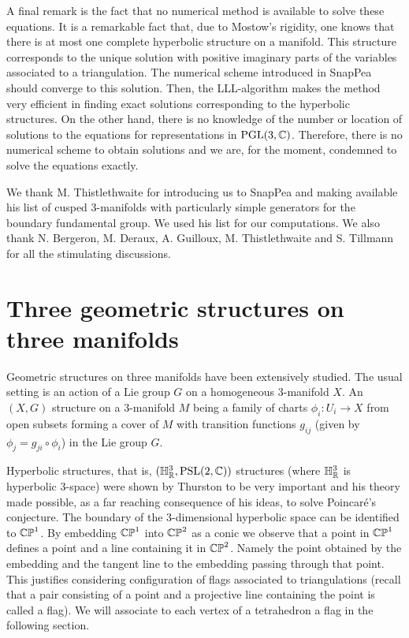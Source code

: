 A final remark is the fact that no numerical method is available to solve these equations. It is a remarkable fact that, due to Mostow's rigidity, one knows that  there is  at most
one complete hyperbolic structure on a manifold.
This structure corresponds to the unique solution with positive imaginary parts of the variables associated to a triangulation.
The numerical scheme introduced in SnapPea should converge to this solution.
Then, the LLL-algorithm makes the method very efficient in finding exact solutions corresponding to the hyperbolic structures.
On the other hand, there is no knowledge of the number or location of solutions to the equations for representations in $\textrm{PGL}(3,\mathbb{C})$. Therefore, there is no numerical scheme to obtain solutions and we are, for the moment, condemned to solve the equations exactly.

We thank M. Thistlethwaite for introducing us to SnapPea and making available his list of cusped 3-manifolds with particularly simple generators
for the boundary fundamental group.  We used his list for our computations.  We also thank N. Bergeron, M. Deraux, A. Guilloux,
 M. Thistlethwaite
and S. Tillmann for all the stimulating discussions.

\section{Three geometric structures on three manifolds}


Geometric structures on three manifolds have been extensively studied.  The usual setting is an action of
a Lie group $G$ on a homogeneous 3-manifold $X$.  An $(X,G)$ structure on a 3-manifold $M$
 being a family of charts $\phi_i : U_i\rightarrow X$
from open subsets forming a cover of $M$ with transition functions $g_{ij}$ (given by $\phi_j=g_{ji}\circ \phi_i $) in the Lie group $G$.

Hyperbolic structures, that is, $({\mathbb H}_{\mathbb{R}}^{3},\mathrm{PSL}(2,\mathbb{C}))$ structures (where ${\mathbb H}_{\mathbb{R}}^{3}$ is hyperbolic 3-space) were shown by Thurston to be very important and his theory
made possible, as a far reaching consequence of his ideas, to solve Poincar\'e's conjecture.   The boundary of the 3-dimensional hyperbolic space can be identified to $\mathbb{CP}^1$.  By embedding $\mathbb{CP}^1$ into $\mathbb{CP}^2$ as a conic
we observe that a point in $\mathbb{CP}^1$ defines a point and a line containing it in $\mathbb{CP}^2$.  Namely the point obtained by the embedding and the tangent line to
the embedding passing through that point.   This justifies considering configuration of flags associated to triangulations (recall that a pair consisting of a point and a projective line containing the point is called a flag).  We will associate to each vertex of a tetrahedron
a flag in the following section.

